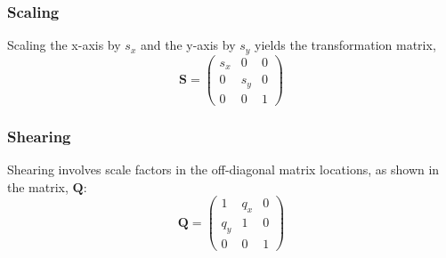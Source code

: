 \subsubsection{Scaling}
Scaling the x-axis by $s_x$ and the y-axis by $s_y$ yields the transformation matrix,
\begin{equation}
    \mathbf{S} =             \left (
    \begin{array}{ccc}
    s_x & 0 & 0 \\
    0 & s_y & 0 \\
    0 & 0 & 1
    \end{array}
    \right )
\end{equation}

\subsubsection{Shearing}
Shearing involves scale factors in the off-diagonal matrix locations, as shown in the matrix, $\mathbf{Q}$:
\begin{equation}
    \mathbf{Q} =             \left (
    \begin{array}{ccc}
    1 & q_x & 0 \\
    q_y & 1 & 0 \\
    0 & 0 & 1
    \end{array}
    \right )
\end{equation}


